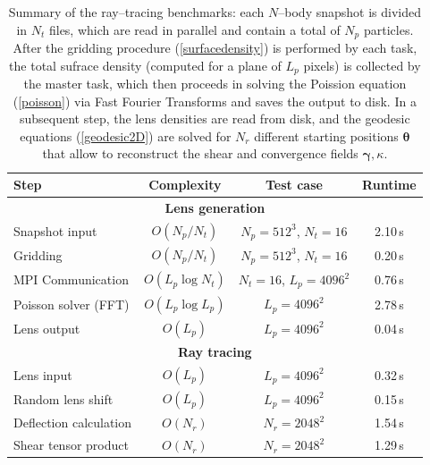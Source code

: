 \documentclass[reprint,aps,prd,superscriptaddress,showkeys,showpacs]{revtex4-1}
\begin{document}
\begin{table}
\begin{tabular}{l|c|c|c}
\toprule
{Step} &            Complexity &            Test case &           Runtime \\ \hline \hline
\midrule
\multicolumn{4}{c}{\textbf{Lens generation}} \\ \hline
Snapshot input & $O(N_p/N_t)$  & $N_p=512^3$, $N_t=16$  & 2.10\,s  \\
Gridding        & $O(N_p/N_t)$   & $N_p=512^3$, $N_t=16$  & 0.20\,s \\
MPI Communication  & $O(L_p\log{N_t})$   & $N_t=16$, $L_p=4096^2$  & 0.76\,s   \\
Poisson solver (FFT)           & $O(L_p\log{L_p})$ & $L_p=4096^2$  &  2.78\,s    \\
Lens output           & $O(L_p)$ & $L_p=4096^2$   & 0.04\,s  \\ \hline \hline

\multicolumn{4}{c}{\textbf{Ray tracing}} \\ \hline
Lens input &  $O(L_p)$ & $L_p=4096^2$ & 0.32\,s \\
Random lens shift &  $O(L_p)$ & $L_p=4096^2$ & 0.15\,s \\
Deflection calculation        &  $O(N_r)$ & $N_r=2048^2$   & 1.54\,s  \\
Shear tensor product               &  $O(N_r)$ & $N_r=2048^2$   &  1.29\,s \\ \hline \hline

\bottomrule
\end{tabular}
\caption{Summary of the ray--tracing benchmarks: each $N$--body snapshot is divided in $N_t$ files, which are read in parallel and contain a total of $N_p$ particles. After the gridding procedure (\ref{surfacedensity}) is performed by each task, the total sufrace density (computed for a plane of $L_p$ pixels) is collected by the master task, which then proceeds in solving the Poission equation (\ref{poisson}) via Fast Fourier Transforms and saves the output to disk. In a subsequent step, the lens densities are read from disk, and the geodesic equations (\ref{geodesic2D}) are solved for $N_r$ different starting positions $\pmb{\theta}$ that allow to reconstruct the shear and convergence fields $\pmb{\gamma},\kappa$.}
\label{benchmarktable}
\end{table}
\end{document}
